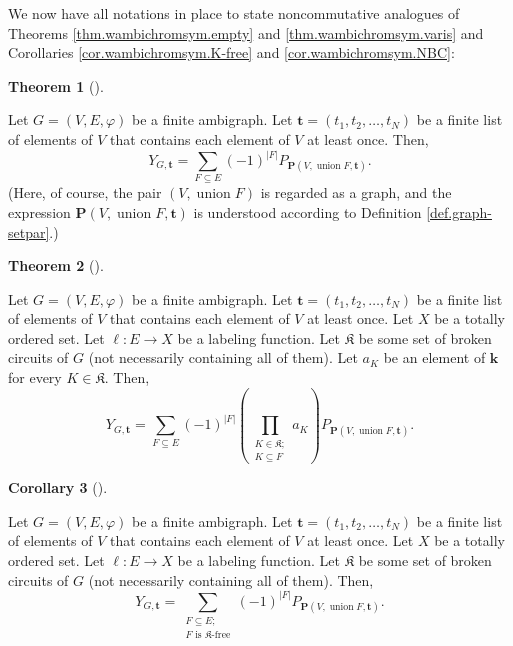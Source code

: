 \documentclass[numbers=enddot,12pt,final,onecolumn,notitlepage]{scrartcl}%
\theoremstyle{definition}
\newtheorem{theo}{Theorem}[section]
\newenvironment{theorem}[1][]
{\begin{theo}[#1]\begin{leftbar}}
{\end{leftbar}\end{theo}}
\newtheorem{coro}[theo]{Corollary}
\newenvironment{corollary}[1][]
{\begin{coro}[#1]\begin{leftbar}}
{\end{leftbar}\end{coro}}
\let\sumnonlimits\sum
\let\prodnonlimits\prod
\renewcommand{\sum}{\sumnonlimits\limits}
\renewcommand{\prod}{\prodnonlimits\limits}
\begin{document}
We now have all notations in place to state noncommutative analogues of
Theorems \ref{thm.wambichromsym.empty} and \ref{thm.wambichromsym.varis} and
Corollaries \ref{cor.wambichromsym.K-free} and \ref{cor.wambichromsym.NBC}:

\begin{theorem}
\label{thm.ncambichromsym.empty}Let $G=\left(  V,E,\varphi\right)  $ be a
finite ambigraph. Let $\mathbf{t}=\left(  t_{1},t_{2},\ldots,t_{N}\right)  $
be a finite list of elements of $V$ that contains each element of $V$ at least
once. Then,%
\[
Y_{G,\mathbf{t}}=\sum_{F\subseteq E}\left(  -1\right)  ^{\left\vert
F\right\vert }P_{\mathbf{P}\left(  V,\operatorname*{union}F,\mathbf{t}\right)
}.
\]
(Here, of course, the pair $\left(  V,\operatorname*{union}F\right)  $ is
regarded as a graph, and the expression $\mathbf{P}\left(
V,\operatorname*{union}F,\mathbf{t}\right)  $ is understood according to
Definition \ref{def.graph-setpar}.)
\end{theorem}

\begin{theorem}
\label{thm.ncambichromsym.varis}Let $G=\left(  V,E,\varphi\right)  $ be a
finite ambigraph. Let $\mathbf{t}=\left(  t_{1},t_{2},\ldots,t_{N}\right)  $
be a finite list of elements of $V$ that contains each element of $V$ at least
once. Let $X$ be a totally ordered set. Let $\ell:E\rightarrow X$ be a
labeling function. Let $\mathfrak{K}$ be some set of broken circuits of $G$
(not necessarily containing all of them). Let $a_{K}$ be an element of
$\mathbf{k}$ for every $K\in\mathfrak{K}$. Then,%
\[
Y_{G,\mathbf{t}}=\sum_{F\subseteq E}\left(  -1\right)  ^{\left\vert
F\right\vert }\left(  \prod_{\substack{K\in\mathfrak{K};\\K\subseteq F}%
}a_{K}\right)  P_{\mathbf{P}\left(  V,\operatorname*{union}F,\mathbf{t}%
\right)  }.
\]

\end{theorem}

\begin{corollary}
\label{cor.ncambichromsym.K-free}Let $G=\left(  V,E,\varphi\right)  $ be a
finite ambigraph. Let $\mathbf{t}=\left(  t_{1},t_{2},\ldots,t_{N}\right)  $
be a finite list of elements of $V$ that contains each element of $V$ at least
once. Let $X$ be a totally ordered set. Let $\ell:E\rightarrow X$ be a
labeling function. Let $\mathfrak{K}$ be some set of broken circuits of $G$
(not necessarily containing all of them). Then,%
\[
Y_{G,\mathbf{t}}=\sum_{\substack{F\subseteq E;\\F\text{ is }\mathfrak{K}%
\text{-free}}}\left(  -1\right)  ^{\left\vert F\right\vert }P_{\mathbf{P}%
\left(  V,\operatorname*{union}F,\mathbf{t}\right)  }.
\]

\end{corollary}
\end{document}
